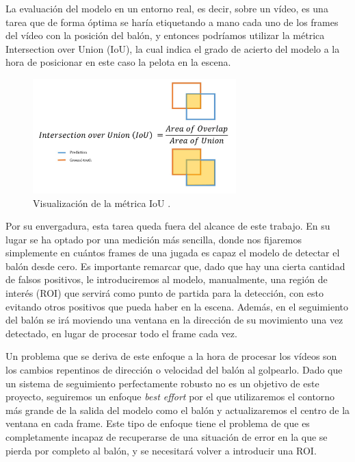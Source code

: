 La evaluación del modelo en un entorno real, es decir, sobre un vídeo, es una tarea que de forma óptima se haría etiquetando a mano cada uno de los frames del vídeo con la posición del balón, y entonces podríamos utilizar la métrica Intersection over Union (IoU), la cual indica el grado de acierto del modelo a la hora de posicionar en este caso la pelota en la escena.

\begin{figure}[H]
  \centering
  \includegraphics[width=0.7\textwidth]{images/IoU.jpg}
  \caption{Visualización de la métrica IoU \cite{kaggleIoU}.}
  \label{fig:IoU}
\end{figure}

Por su envergadura, esta tarea queda fuera del alcance de este trabajo. En su lugar se ha optado por una medición más sencilla, donde nos fijaremos simplemente en cuántos frames de una jugada es capaz el modelo de detectar el balón desde cero. Es importante remarcar que, dado que hay una cierta cantidad de falsos positivos, le introduciremos al modelo, manualmente, una región de interés (ROI) que servirá como punto de partida para la detección, con esto evitando otros positivos que pueda haber en la escena. Además, en el seguimiento del balón se irá moviendo una ventana en la dirección de su movimiento una vez detectado, en lugar de procesar todo el frame cada vez.

Un problema que se deriva de este enfoque a la hora de procesar los vídeos son los cambios repentinos de dirección o velocidad del balón al golpearlo. Dado que un sistema de seguimiento perfectamente robusto no es un objetivo de este proyecto, seguiremos un enfoque \textit{best effort} por el que utilizaremos el contorno más grande de la salida del modelo como el balón y actualizaremos el centro de la ventana en cada frame. Este tipo de enfoque tiene el problema de que es completamente incapaz de recuperarse de una situación de error en la que se pierda por completo al balón, y se necesitará volver a introducir una ROI.

